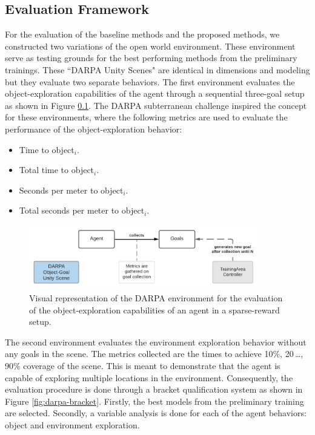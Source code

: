 \subsection{Evaluation Framework}
For the evaluation of the baseline methods and the proposed methods, we constructed two variations of the open world environment. These environment serve as testing grounds for the best performing methods from the preliminary trainings. These “DARPA Unity Scenes" are identical in dimensions and modeling but they evaluate two separate behaviors. The first environment evaluates the object-exploration capabilities of the agent through a sequential three-goal setup as shown in Figure \ref{}. The DARPA subterranean challenge \cite{darpa_subterranean_challenge} inspired the concept for these environments, where the following metrics are used to evaluate the performance of the object-exploration behavior:
\begin{multicols}{2}
    \begin{itemize}
        \item Time to object$_i$.
        \item Total time to object$_i$.
        \item Seconds per meter to object$_i$.
        \item Total seconds per meter to object$_i$.
    \end{itemize}
\end{multicols}
\begin{figure}[!ht]
        \centering
        \includegraphics[width=0.9\textwidth]{images/darpa-object-setup_3.png} 
        \caption{Visual representation of the DARPA environment for the evaluation of the object-exploration capabilities of an agent in a sparse-reward setup.}
        \label{fig:darpa-object-setup}
\end{figure}
The second environment evaluates the environment exploration behavior without any goals in the scene. The metrics collected are the times to achieve 10\%, 20\,…, 90\% coverage of the scene. This is meant to demonstrate that the agent is capable of exploring multiple locations in the environment.
Consequently, the evaluation procedure is done through a bracket qualification system as shown in Figure \ref{fig:darpa-bracket}. Firstly, the best models from the preliminary training are selected. Secondly, a variable analysis is done for each of the agent behaviors: object and environment exploration. 
